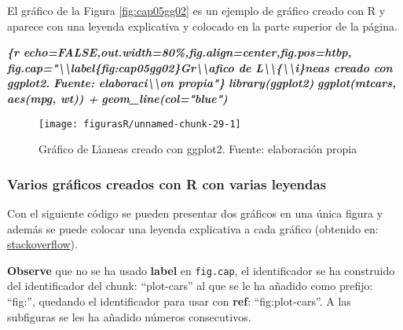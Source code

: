 \documentclass[12pt,a4paper,]{book}
\newenvironment{Shaded}{\begin{snugshade}}{\end{snugshade}}
\newcommand{\InformationTok}[1]{\textcolor[rgb]{0.56,0.35,0.01}{\textbf{\textit{#1}}}}
\numberwithin{dummy}{section}
\theoremstyle{ocrenumbox}
\theoremstyle{blacknumex}
\theoremstyle{blacknumbox}
\theoremstyle{ocrenum}
\theoremstyle{ocrenum}
\begin{document}
El gráfico de la Figura \ref{fig:cap05gg02} es un ejemplo de gráfico
creado con R y aparece con una leyenda explicativa y colocado en la
parte superior de la página.

\begin{Shaded}
\begin{Highlighting}[]
\InformationTok{\textasciigrave{}\textasciigrave{}\textasciigrave{}\{r echo=FALSE,out.width=\textquotesingle{}80\%\textquotesingle{},fig.align=\textquotesingle{}center\textquotesingle{},fig.pos=\textquotesingle{}htbp\textquotesingle{},}
\InformationTok{fig.cap="\textbackslash{}\textbackslash{}label\{fig:cap05gg02\}Gr\textbackslash{}\textbackslash{}\textquotesingle{}afico de L\textbackslash{}\textbackslash{}\textquotesingle{}\{\textbackslash{}\textbackslash{}i\}neas creado con ggplot2. }
\InformationTok{Fuente: elaboraci\textbackslash{}\textbackslash{}\textquotesingle{}on propia"\}}
\InformationTok{library(ggplot2)}
\InformationTok{ggplot(mtcars, aes(mpg, wt)) + }
\InformationTok{  geom\_line(col="blue")}
\InformationTok{\textasciigrave{}\textasciigrave{}\textasciigrave{}}
\end{Highlighting}
\end{Shaded}

\begin{figure}[htbp]
 
 {\centering \texttt{[image: figurasR/unnamed-chunk-29-1]} 
 
 }
 
 \caption{\label{fig:cap05gg02}Gr\'afico de L\'{\i}aneas creado con ggplot2. Fuente: elaboraci\'on propia}\label{fig:unnamed-chunk-29}
 \end{figure}

\hypertarget{varios-gruxe1ficos-creados-con-r-con-varias-leyendas}{%
\subsubsection{Varios gráficos creados con R con varias
leyendas}\label{varios-gruxe1ficos-creados-con-r-con-varias-leyendas}}

Con el siguiente código se pueden presentar dos gráficos en una única
figura y además se puede colocar una leyenda explicativa a cada gráfico
(obtenido en:
\href{https://stackoverflow.com/questions/53850299/how-to-get-a-newline-in-a-figure-caption-in-rmarkdown-bookdown-pdfdocument2}{stackoverflow}).

\textbf{Observe} que no se ha usado \textbf{label} en \texttt{fig.cap},
el identificador se ha construido del identificador del chunk:
``plot-cars'' al que se le ha añadido como prefijo: ``fig:'', quedando
el identificador para usar con \textbf{ref}: ``fig:plot-cars''. A las
subfiguras se les ha añadido números consecutivos.
\end{document}
